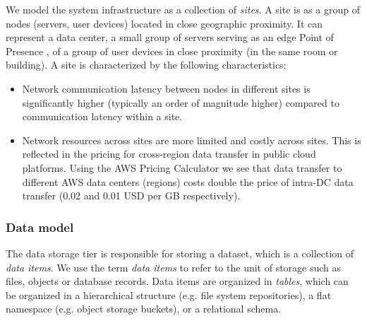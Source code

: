 We model the system infrastructure as a collection of \textit{sites}.
A site is as a group of nodes (servers, user devices) located in close geographic proximity.
It can represent a data center, a small group of servers serving as an edge Point of Presence \cite{google:infra}, of
a group of user devices in close proximity (in the same room or building).
A site is characterized by the following characteristics:
\begin{itemize}
  \item Network communication latency between nodes in different sites is significantly higher (typically an order of
  magnitude higher) \cite{pbailis:hats} compared to communication latency within a site.
  \item Network resources across sites are more limited and costly across sites.
  This is reflected in the pricing for cross-region data transfer in public cloud platforms.
  Using the AWS Pricing Calculator \cite{aws:costcalc} we see that data transfer to different AWS data centers
  (regions) costs double the price of intra-DC data transfer (0.02 and 0.01 USD per GB respectively).
\end{itemize}



\subsubsection{Data model}
The data storage tier is responsible for storing a dataset, which is a collection of \textit{data items}.
We use the term \textit{data items} to refer to the unit of storage such as files, objects or database records.
Data items are organized in \textit{tables}, which can be organized in a hierarchical structure
(e.g. file system repositories), a flat namespace (e.g. object storage buckets), or a relational schema.


